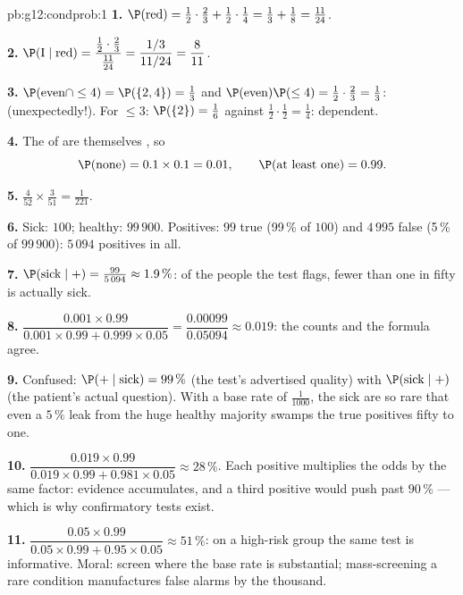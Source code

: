 \begin{solution}{pb:g12:condprob:1}
\textbf{1.} $\P(\text{red}) = \frac12 \cdot \frac23 + \frac12
\cdot \frac14 = \frac13 + \frac18 = \frac{11}{24}$.

\textbf{2.} $\P(\text{I} \mid \text{red}) =
\dfrac{\frac12 \cdot \frac23}{\frac{11}{24}} =
\dfrac{1/3}{11/24} = \dfrac{8}{11}$.

\textbf{3.} $\P(\text{even} \cap \leq 4) = \P(\{2, 4\}) =
\frac13$ and $\P(\text{even})\P(\leq 4) = \frac12 \cdot
\frac23 = \frac13$:  (unexpectedly!). For
$\leq 3$: $\P(\{2\}) = \frac16$ against
$\frac12 \cdot \frac12 = \frac14$: dependent.

\textbf{4.} The  of
 are themselves
, so
\[
\P(\text{none}) = 0.1 \times 0.1 = 0.01,
\qquad
\P(\text{at least one}) = 0.99 .
\]

\textbf{5.} $\frac{4}{52} \times \frac{3}{51} =
\frac{1}{221}$.

\textbf{6.} Sick: $100$; healthy: $99\,900$. Positives:
$99$ true (99\,\% of $100$) and $4\,995$ false (5\,\% of
$99\,900$): $5\,094$ positives in all.

\textbf{7.} $\P(\text{sick} \mid +) = \frac{99}{5\,094}
\approx 1.9\,\%$: of the people the test flags, fewer than
one in fifty is actually sick.

\textbf{8.} $\dfrac{0.001 \times 0.99}{0.001 \times 0.99 +
0.999 \times 0.05} = \dfrac{0.00099}{0.05094} \approx 0.019$:
the counts and the formula agree.

\textbf{9.} Confused: $\P(+ \mid \text{sick}) = 99\,\%$
(the test's advertised quality) with
$\P(\text{sick} \mid +)$ (the patient's actual question). With
a base rate of $\frac{1}{1000}$, the sick are so rare that
even a $5\,\%$ leak from the huge healthy majority swamps the
true positives fifty to one.

\textbf{10.} $\dfrac{0.019 \times 0.99}{0.019 \times 0.99 +
0.981 \times 0.05} \approx 28\,\%$. Each  positive
multiplies the odds by the same factor: evidence accumulates,
and a third positive would push past $90\,\%$ --- which is
why confirmatory tests exist.

\textbf{11.} $\dfrac{0.05 \times 0.99}{0.05 \times 0.99 +
0.95 \times 0.05} \approx 51\,\%$: on a high-risk group the
same test is informative. Moral: screen where the base rate
is substantial; mass-screening a rare condition manufactures
false alarms by the thousand.


\end{solution}
